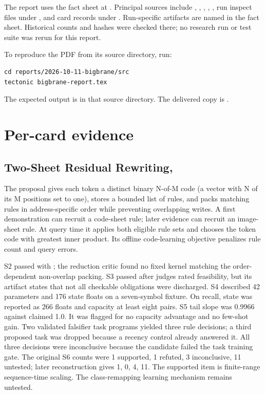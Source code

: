 The report uses the fact sheet at . Principal sources include , , , , , run inspect files under , and card records under . Run-specific artifacts are named in the fact sheet. Historical counts and hashes were checked there; no research run or test suite was rerun for this report.

To reproduce the PDF from its source directory, run:
\begin{verbatim}
cd reports/2026-10-11-bigbrane/src
tectonic bigbrane-report.tex
\end{verbatim}
The expected output is  in that source directory. The delivered copy is .

\section{Per-card evidence}

\subsection{Two-Sheet Residual Rewriting, }

The proposal gives each token a distinct binary N-of-M code (a vector with N of its M positions set to one), stores a bounded list of rules, and packs matching rules in address-specific order while preventing overlapping writes. A first demonstration can recruit a code-sheet rule; later evidence can recruit an image-sheet rule. At query time it applies both eligible rule sets and chooses the token code with greatest inner product. Its offline code-learning objective penalizes rule count and query errors.

S2 passed with ; the reduction critic found no fixed kernel matching the order-dependent non-overlap packing. S3 passed after judges rated feasibility, but its artifact states that not all checkable obligations were discharged. S4 described 42 parameters and 176 state floats on a seven-symbol fixture. On recall, state was reported as 266 floats and capacity at least eight pairs. S5 tail slope was 0.9966 against claimed 1.0. It was flagged for no capacity advantage and no few-shot gain. Two validated falsifier task programs yielded three rule decisions; a third proposed task was dropped because a recency control already answered it. All three decisions were inconclusive because the candidate failed the task training gate. The original S6 counts were 1 supported, 1 refuted, 3 inconclusive, 11 untested; later reconstruction gives 1, 0, 4, 11. The supported item is finite-range sequence-time scaling. The class-remapping learning mechanism remains untested.

